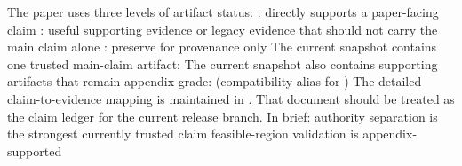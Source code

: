 {}
\markdownRendererSectionEnd \markdownRendererSectionBegin
{}\markdownRendererInterblockSeparator
{}The paper uses three levels of artifact status:\markdownRendererInterblockSeparator
{}\markdownRendererUlBeginTight
\markdownRendererUlItem {}: directly supports a paper-facing claim\markdownRendererUlItemEnd 
\markdownRendererUlItem {}: useful supporting evidence or legacy evidence that should not carry the main claim alone\markdownRendererUlItemEnd 
\markdownRendererUlItem {}: preserve for provenance only\markdownRendererUlItemEnd 
\markdownRendererUlEndTight \markdownRendererInterblockSeparator
{}The current snapshot contains one trusted main-claim artifact:\markdownRendererInterblockSeparator
{}\markdownRendererUlBeginTight
\markdownRendererUlItem {}\markdownRendererUlItemEnd 
\markdownRendererUlEndTight \markdownRendererInterblockSeparator
{}The current snapshot also contains supporting artifacts that remain appendix-grade:\markdownRendererInterblockSeparator
{}\markdownRendererUlBeginTight
\markdownRendererUlItem {}  (compatibility alias for )\markdownRendererUlItemEnd 
\markdownRendererUlItem {}\markdownRendererUlItemEnd 
\markdownRendererUlEndTight \markdownRendererInterblockSeparator
{}
\markdownRendererSectionEnd \markdownRendererSectionBegin
{}\markdownRendererInterblockSeparator
{}The detailed claim-to-evidence mapping is maintained in .\markdownRendererSoftLineBreak
{}That document should be treated as the claim ledger for the current release branch.\markdownRendererParagraphSeparator
{}In brief:\markdownRendererInterblockSeparator
{}\markdownRendererUlBeginTight
\markdownRendererUlItem authority separation is the strongest currently trusted claim\markdownRendererUlItemEnd 
\markdownRendererUlItem feasible-region validation is appendix-supported\markdownRendererUlItemEnd 
